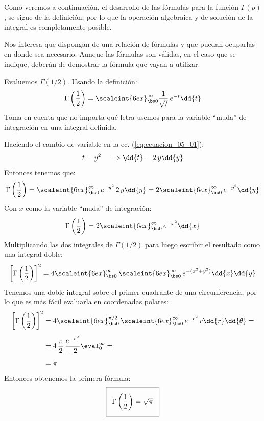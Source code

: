 Como veremos a continuación, el desarrollo de las fórmulas para la función $\Gamma (p)$, se sigue de la definición, por lo que la operación algebraica y de solución de la integral es completamente posible.
\par
Nos interesa que dispongan de una relación de fórmulas y que puedan ocuparlas en donde sea necesario. Aunque las fórmulas son válidas, en el caso que se indique, deberán de demostrar la fórmula que vayan a utilizar.
\par 
Evaluemos $\Gamma (1/2)$. Usando la definición:
\begin{align}
\Gamma \left( \dfrac{1}{2}\right) = \scaleint{6ex}_{\bs 0}^{\infty} \dfrac{1}{\sqrt{t}} \, e^{-t} \dd{t}
\label{eq:ecuacion_05_01}
\end{align}
Toma en cuenta que no importa qué letra usemos para la variable \enquote{muda} de integración en una integral definida.
\par
Haciendo el cambio de variable en la ec. (\ref{eq:ecuacion_05_01}):
\begin{align*}
t = y^{2} \hspace{0.5cm} \Rightarrow \dd{t} = 2 \, y \dd{y}
\end{align*}
Entonces tenemos que:
\begin{align*}
\Gamma \left( \dfrac{1}{2} \right) = \scaleint{6ex}_{\bs 0}^{\infty} \, e^{-y^{2}} \, 2 \, y \dd{y} = 2 \scaleint{6ex}_{\bs 0}^{\infty} \, e^{-y^{2}} \dd{y}
\end{align*}
Con $x$ como la variable \enquote{muda} de integración:
\begin{align}
\Gamma \left( \dfrac{1}{2} \right) = 2 \scaleint{6ex}_{\bs 0}^{\infty} \, e^{-x^{2}} \dd{x}
\label{eq:ecuacion_05_02}
\end{align}
Multiplicando las dos integrales de $\Gamma (1/2)$ para luego escribir el resultado como una integral doble:
\begin{align*}
\left[ \Gamma \left( \dfrac{1}{2} \right) \right]^{2} = 4 \scaleint{6ex}_{\bs 0}^{\infty} \, \scaleint{6ex}_{\bs 0}^{\infty} \, e^{-(x^{2} + y^{2})} \dd{x} \dd{y}
\end{align*}
Tenemos una doble integral sobre el primer cuadrante de una circunferencia, por lo que es más fácil evaluarla en coordenadas polares:
\begin{align*}
\left[ \Gamma \left( \dfrac{1}{2} \right) \right]^{2} &= 4 \scaleint{6ex}_{\bs 0}^{\pi/2} \, \scaleint{6ex}_{\bs 0}^{\infty} \, e^{-r^{2}} \, r \dd{r} \dd{\theta} = \\[0.5em]
&= 4 \, \dfrac{\pi}{2} \, \dfrac{e^{-r^{2}}}{-2}\eval_{0}^{\infty} = \\[0.5em]
&= \pi
\end{align*}
Entonces obtenemos la primera fórmula:
\begin{align}\addtolength{\fboxsep}{5pt}\boxed{
\Gamma \left( \dfrac{1}{2} \right) = \sqrt{\pi}}
\label{eq:ecuacion_05_03}
\end{align}

